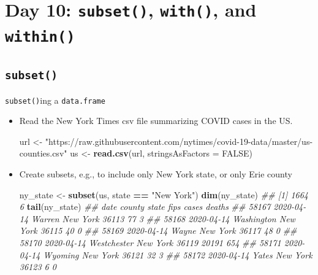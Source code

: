 \documentclass[
]{book}
\newenvironment{Shaded}{\begin{snugshade}}{\end{snugshade}}
\newcommand{\CommentTok}[1]{\textcolor[rgb]{0.56,0.35,0.01}{\textit{#1}}}
\newcommand{\DataTypeTok}[1]{\textcolor[rgb]{0.13,0.29,0.53}{#1}}
\newcommand{\KeywordTok}[1]{\textcolor[rgb]{0.13,0.29,0.53}{\textbf{#1}}}
\newcommand{\NormalTok}[1]{#1}
\newcommand{\OperatorTok}[1]{\textcolor[rgb]{0.81,0.36,0.00}{\textbf{#1}}}
\newcommand{\OtherTok}[1]{\textcolor[rgb]{0.56,0.35,0.01}{#1}}
\newcommand{\StringTok}[1]{\textcolor[rgb]{0.31,0.60,0.02}{#1}}
\begin{document}
\hypertarget{day-10-subset-with-and-within}{%
\section{\texorpdfstring{Day 10: \texttt{subset()}, \texttt{with()}, and \texttt{within()}}{Day 10: subset(), with(), and within()}}\label{day-10-subset-with-and-within}}

\hypertarget{subset}{%
\subsection*{\texorpdfstring{\texttt{subset()}}{subset()}}\label{subset}}

\texttt{subset()}ing a \texttt{data.frame}

\begin{itemize}
\item
  Read the New York Times csv file summarizing COVID cases in the US.

\begin{Shaded}
\begin{Highlighting}[]
\NormalTok{url <-}
\StringTok{  "https://raw.githubusercontent.com/nytimes/covid-19-data/master/us-counties.csv"}
\NormalTok{us <-}\StringTok{ }\KeywordTok{read.csv}\NormalTok{(url, }\DataTypeTok{stringsAsFactors =} \OtherTok{FALSE}\NormalTok{)}
\end{Highlighting}
\end{Shaded}
\item
  Create subsets, e.g., to include only New York state, or only Erie county

\begin{Shaded}
\begin{Highlighting}[]
\NormalTok{ny_state <-}\StringTok{ }\KeywordTok{subset}\NormalTok{(us, state }\OperatorTok{==}\StringTok{ "New York"}\NormalTok{)}
\KeywordTok{dim}\NormalTok{(ny_state)}
\CommentTok{## [1] 1664    6}
\KeywordTok{tail}\NormalTok{(ny_state)}
\CommentTok{##             date      county    state  fips cases deaths}
\CommentTok{## 58167 2020-04-14      Warren New York 36113    77      3}
\CommentTok{## 58168 2020-04-14  Washington New York 36115    40      0}
\CommentTok{## 58169 2020-04-14       Wayne New York 36117    48      0}
\CommentTok{## 58170 2020-04-14 Westchester New York 36119 20191    654}
\CommentTok{## 58171 2020-04-14     Wyoming New York 36121    32      3}
\CommentTok{## 58172 2020-04-14       Yates New York 36123     6      0}


\end{Highlighting}
\end{Shaded}
\end{itemize}
\end{document}
